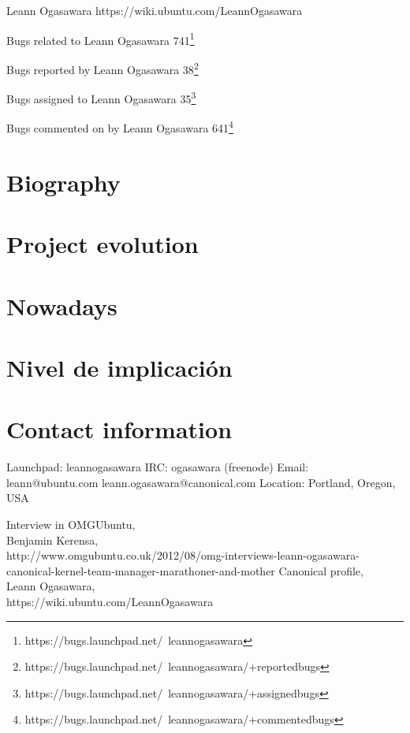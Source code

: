 \documentclass[11pt]{scrartcl}
\begin{document}
Leann Ogasawara https://wiki.ubuntu.com/LeannOgasawara

Bugs related to Leann Ogasawara 741\footnote{https://bugs.launchpad.net/~leannogasawara}

Bugs reported by Leann Ogasawara 38\footnote{https://bugs.launchpad.net/~leannogasawara/+reportedbugs}

Bugs assigned to Leann Ogasawara 35\footnote{https://bugs.launchpad.net/~leannogasawara/+assignedbugs}

Bugs commented on by Leann Ogasawara 641\footnote{https://bugs.launchpad.net/~leannogasawara/+commentedbugs}

\section{Biography}

\section{Project evolution}

\section{Nowadays}

\section{Nivel de implicación}

\section{Contact information}

Launchpad:
leannogasawara
IRC:
ogasawara (freenode)
Email:
leann@ubuntu.com
leann.ogasawara@canonical.com
Location:
Portland, Oregon, USA
\begin{thebibliography}{9}

      Interview in OMGUbuntu,\\
      Benjamin Kerensa,\\
      http://www.omgubuntu.co.uk/2012/08/omg-interviews-leann-ogasawara-canonical-kernel-team-manager-marathoner-and-mother
    Canonical profile,\\
    Leann Ogasawara,\\
    https://wiki.ubuntu.com/LeannOgasawara

\end{thebibliography}
\end{document}
